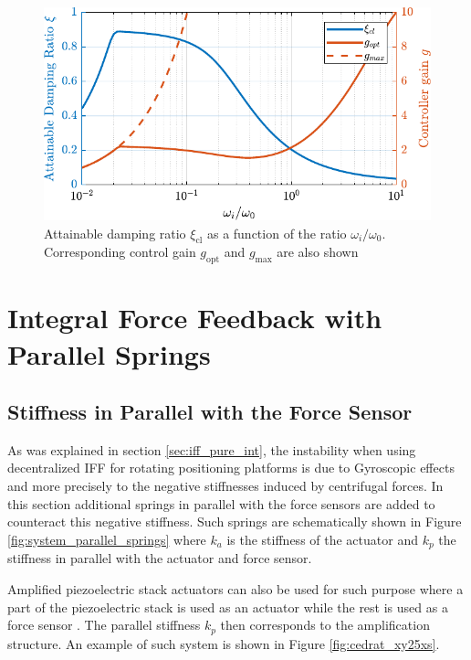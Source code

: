 \documentclass{ISMA_USD2020}
\begin{document}
\begin{figure}[htbp]
\centering
\includegraphics[scale=1]{figs/mod_iff_damping_wi.pdf}
\caption{\label{fig:mod_iff_damping_wi}Attainable damping ratio \(\xi_\text{cl}\) as a function of the ratio \(\omega_i/\omega_0\). Corresponding control gain \(g_\text{opt}\) and \(g_\text{max}\) are also shown}
\end{figure}

\section{Integral Force Feedback with Parallel Springs}
\label{sec:orgfe69ffb}
\label{sec:iff_kp}
\subsection{Stiffness in Parallel with the Force Sensor}
\label{sec:org02dc3a4}
As was explained in section \ref{sec:iff_pure_int}, the instability when using decentralized IFF for rotating positioning platforms is due to Gyroscopic effects and more precisely to the negative stiffnesses induced by centrifugal forces.
In this section additional springs in parallel with the force sensors are added to counteract this negative stiffness.
Such springs are schematically shown in Figure \ref{fig:system_parallel_springs} where \(k_a\) is the stiffness of the actuator and \(k_p\) the stiffness in parallel with the actuator and force sensor.

Amplified piezoelectric stack actuators can also be used for such purpose where a part of the piezoelectric stack is used as an actuator while the rest is used as a force sensor \cite{souleille18_concep_activ_mount_space_applic}.
The parallel stiffness \(k_p\) then corresponds to the amplification structure.
An example of such system is shown in Figure \ref{fig:cedrat_xy25xs}.
\end{document}
